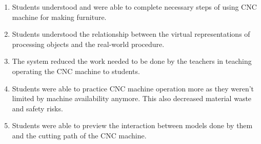 \begin{enumerate}
	\item Students understood and were able to complete necessary steps of using CNC machine for making furniture.
	\item Students understood the relationship between the virtual representations of processing objects and the real-world procedure.
	\item The system reduced the work needed to be done by the teachers in teaching operating the CNC machine to students.
	\item Students were able to practice CNC machine operation more as they weren't limited by machine availability anymore. This also decreased material waste and safety risks.
	\item Students were able to preview the interaction between models done by them and the cutting path of the CNC machine.
\end{enumerate}

